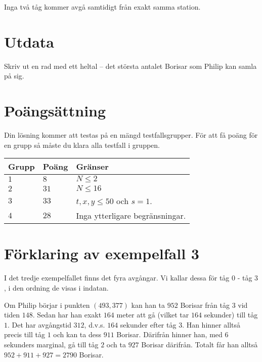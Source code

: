 Inga två tåg kommer avgå samtidigt från exakt samma station.

\section*{Utdata}
Skriv ut en rad med ett heltal -- det största antalet Borisar som Philip kan samla på sig.

\section*{Poängsättning}
Din lösning kommer att testas på en mängd testfallsgrupper.
För att få poäng för en grupp så måste du klara alla testfall i gruppen.

\noindent
\begin{tabular}{| l | l | l |}
  \hline
  \textbf{Grupp} & \textbf{Poäng} & \textbf{Gränser} \\ \hline
  $1$   & $8$        & $N \le 2$ \\ \hline
  $2$   & $31$       & $N \le 16$ \\ \hline
  $3$   & $33$       & $t,x,y\le 50$ och $s = 1$. \\ \hline
  $4$   & $28$       & Inga ytterligare begränsningar. \\ \hline
\end{tabular}

\section*{Förklaring av exempelfall 3}
I det tredje exempelfallet finns det fyra avgångar.
Vi kallar dessa för tåg $0$ - tåg $3$, i den ordning de visas i indatan.

Om Philip börjar i punkten $(493,377)$ kan han ta $952$ Borisar från tåg $3$ vid tiden $148$. Sedan har han exakt $164$ meter att gå (vilket tar $164$ sekunder) till tåg $1$. Det har avgångstid $312$, d.v.s. $164$ sekunder efter tåg $3$. 
Han hinner alltså precis till tåg $1$ och kan ta dess $911$ Borisar. Därifrån hinner han, med $6$ sekunders marginal, gå till tåg $2$ och ta $927$ Borisar därifrån. Totalt får han alltså $952+911+927=2790$ Borisar. 
